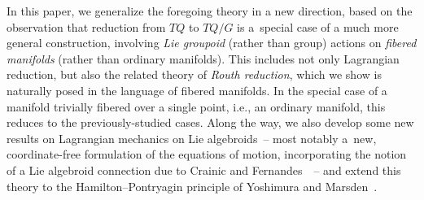 \documentclass[10pt,a4paper]{amsart}
\numberwithin{equation}{section}
\begin{document}
In this paper, we generalize the foregoing theory in a new direction, based on the observation that reduction from $ T Q $ to $ T Q / G $ is a~special case of a much more general construction, involving \emph{Lie groupoid} (rather than group) actions on \emph{fibered manifolds} (rather than ordinary manifolds). This includes not only Lagrangian reduction, but also the related theory of \emph{Routh reduction}, which we show is naturally posed in the language of f\/ibered manifolds. In the special case of a manifold trivially f\/ibered over a single point, i.e., an ordinary manifold, this reduces to the previously-studied cases. Along the way, we also develop some new results on Lagrangian mechanics on Lie algebroids~-- most notably a~new, coordinate-free formulation of the equations of motion, incorporating the notion of a Lie algebroid connection due to Crainic and Fernandes~\cite{CrFe2003}~-- and extend this theory to the Hamilton--Pontryagin principle of Yoshimura and Marsden~\cite{YoMa2006b}.
\end{document}
